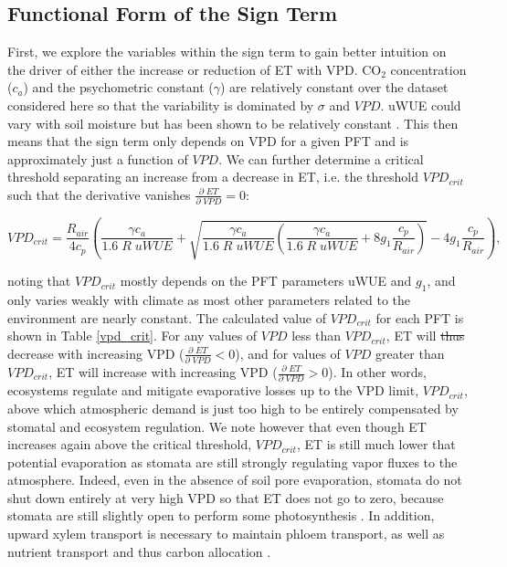 \documentclass[draft,linenumbers]{agujournal}
\providecommand{\DIFdel}[1]{{\protect\color{red}\sout{#1}}}                      %
\providecommand{\DIFdelbegin}{} %
\providecommand{\DIFdelend}{} %
\begin{document}
\subsection{Functional Form of the Sign Term}
\label{sign_term}
First, we explore the variables within the sign term to gain better
intuition on the driver of either the increase or reduction of ET with
VPD. CO$_2$ concentration ($c_a$) and the psychometric constant
($\gamma$) are relatively constant over the dataset considered here so
that the variability is dominated by $\sigma$ and $VPD$. uWUE could
vary with soil moisture but has been shown to be relatively constant
\citep{Zhou_2015}. This then means that the sign term only depends on
VPD for a given PFT and is approximately just a function of $VPD$. We
can further determine a critical threshold separating an increase from
a decrease in ET, i.e. the threshold $VPD_{crit}$ such that the
derivative vanishes $\frac{\partial \; ET}{\partial \; VPD} = 0$:
\small
\begin{linenomath*}
  \begin{equation}
    VPD_{crit} = \frac{R_{air}}{4 c_p} \left( \frac{\gamma c_a}{1.6\; R \;  uWUE} + \sqrt{\frac{\gamma c_a}{1.6\; R \;  uWUE}\left( \frac{\gamma c_a}{1.6\; R \;  uWUE} + 8 g_1 \frac{c_p}{R_{air}}\right)} - 4 g_1 \frac{c_p}{R_{air}} \right),
    \label{vpd_min_et}
  \end{equation}
\end{linenomath*}
\normalsize noting that $VPD_{crit}$ mostly depends on the PFT
parameters uWUE and $g_1$, and only varies weakly with climate as most
other parameters related to the environment are nearly constant. The
calculated value of $VPD_{crit}$ for each PFT is shown in Table
\ref{vpd_crit}. For any values of $VPD$ less than $VPD_{crit}$, ET
will \DIFdelbegin \DIFdel{thus }\DIFdelend decrease with increasing VPD
($\frac{\partial \; ET}{\partial \; VPD} < 0$), and for values of
$VPD$ greater than $VPD_{crit}$, ET will increase with increasing VPD
($\frac{\partial \; ET}{\partial \; VPD} > 0$). In other words,
ecosystems regulate and mitigate evaporative losses up to the VPD
limit, $VPD_{crit}$, above which atmospheric demand is just too high
to be entirely compensated by stomatal and ecosystem regulation. We
note however that even though ET increases again above the critical
threshold, $VPD_{crit}$, ET is still much lower that potential
evaporation as stomata are still strongly regulating vapor fluxes to
the atmosphere. Indeed, even in the absence of soil pore evaporation,
stomata do not shut down entirely at very high VPD so that ET does not
go to zero, because stomata are still slightly open to perform some
photosynthesis \citep{Ball_1987, Leuning_1990, MEDLYN_2011}. In
addition, upward xylem transport is necessary to maintain phloem
transport, as well as nutrient transport and thus carbon allocation
\citep{De_2013, Nikinmaa_2013, Ryan_2014}.
\end{document}
